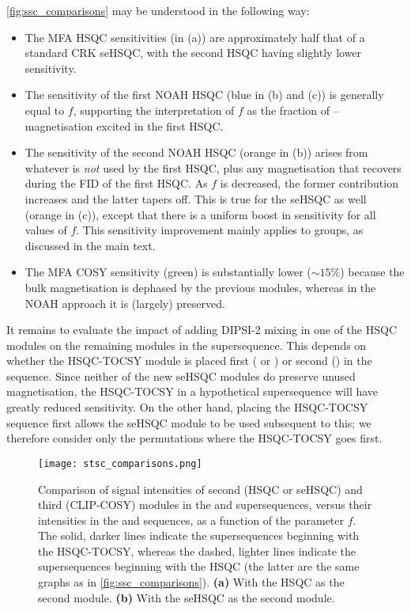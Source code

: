\cref{fig:ssc_comparisons} may be understood in the following way:

\begin{itemize}
    \item The MFA HSQC sensitivities (in (a)) are approximately half that of a standard CRK seHSQC, with the second HSQC having slightly lower sensitivity.\autocite{Nolis2019CPC}
    \item The sensitivity of the first NOAH HSQC (blue in (b) and (c)) is generally equal to $f$, supporting the interpretation of $f$ as the fraction of \carbon{}--\proton{} magnetisation excited in the first HSQC.
    \item The sensitivity of the second NOAH HSQC (orange in (b)) arises from whatever is \textit{not} used by the first HSQC, plus any magnetisation that recovers during the FID of the first HSQC.
        As $f$ is decreased, the former contribution increases and the latter tapers off.
        This is true for the seHSQC as well (orange in (c)), except that there is a uniform boost in sensitivity for all values of $f$.
        This sensitivity improvement mainly applies to  groups, as discussed in the main text.
    \item The MFA COSY sensitivity (green) is substantially lower ($\sim 15\%$) because the bulk magnetisation is dephased by the previous modules, whereas in the NOAH approach it is (largely) preserved.
\end{itemize}

It remains to evaluate the impact of adding DIPSI-2 mixing in one of the HSQC modules on the remaining modules in the supersequence.
This depends on whether the HSQC-TOCSY module is placed first ( or ) or second () in the sequence.
Since neither of the new seHSQC modules do preserve unused  magnetisation, the HSQC-TOCSY in a hypothetical  supersequence will have greatly reduced sensitivity.
On the other hand, placing the HSQC-TOCSY sequence first allows the seHSQC module to be used subsequent to this; we therefore consider only the permutations where the HSQC-TOCSY goes first.

\begin{figure}
    \centering
    \texttt{[image: stsc\_comparisons.png]}
    \caption{
        Comparison of signal intensities of second (HSQC or seHSQC) and third (CLIP-COSY) modules in the  and  supersequences, versus their intensities in the  and  sequences, as a function of the parameter $f$.
        The solid, darker lines indicate the supersequences beginning with the HSQC-TOCSY, whereas the dashed, lighter lines indicate the supersequences beginning with the HSQC (the latter are the same graphs as in \cref{fig:ssc_comparisons}).
        \textbf{(a)} With the HSQC as the second module.
        \textbf{(b)} With the seHSQC as the second module.
        \andro{}
    }
    \label{fig:stsc_comparisons}
\end{figure}

